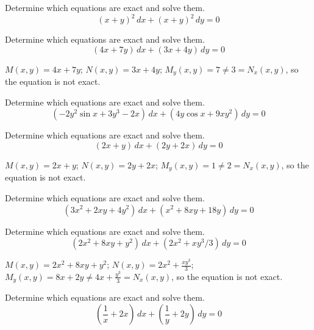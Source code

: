 \documentclass{ximera}
\begin{document}
\begin{problem}\label{exer:2.5.5} Determine which equations are exact and solve them.
$$(x+y)^2\,dx+(x+y)^2\,dy=0$$
\end{problem}

\begin{problem}\label{exer:2.5.6} Determine which equations are exact and solve them.
$$(4x+7y)\,dx+(3x+4y)\,dy=0$$



\begin{solution}
    $M(x,y)=4x+7y$;\;
$N(x,y)=3x+4y$;\;
$M_y(x,y)=7\neq 3=N_x(x,y)$,
so the  equation is not exact.
\end{solution}
\end{problem}

\begin{problem}\label{exer:2.5.7} Determine which equations are exact and solve them.
$$(-2y^2\sin x+3y^3-2x)\,dx+(4y\cos x+9xy^2)\,dy=0$$
\end{problem}

\begin{problem}\label{exer:2.5.8} Determine which equations are exact and solve them.
$$(2x+y)\,dx+(2y+2x)\,dy=0$$



\begin{solution}
    $M(x,y)=2x+y$;\;
$N(x,y)=2y+2x$;\;
$M_y(x,y)=1\neq 2=N_x(x,y)$,
so the  equation is not exact.
\end{solution}
\end{problem}

\begin{problem}\label{exer:2.5.9} Determine which equations are exact and solve them.
$$(3x^2+2xy+4y^2)\,dx+(x^2+8xy+18y)\,dy=0$$
\end{problem}

\begin{problem}\label{exer:2.5.10} Determine which equations are exact and solve them.
$$(2x^2+8xy+y^2)\,dx+(2x^2+xy^3/3)\,dy=0$$



\begin{solution}
    $M(x,y)=2x^2+8xy+y^2$;\;
$N(x,y)=2x^2+\frac{xy^3}{3}$;\;
$M_y(x,y)=8x+2y\neq 4x+\frac{y^3}{3}=N_x(x,y)$,
so the  equation is not exact.
\end{solution}
\end{problem}

\begin{problem}\label{exer:2.5.11} Determine which equations are exact and solve them.
$$\left(\frac{1}{x}+2x\right)\,dx+\left(\frac{1}{y}+2y\right)\,dy=0$$
\end{problem}
\end{document}
